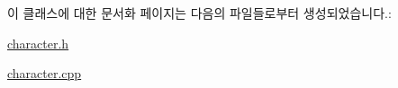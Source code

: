 이 클래스에 대한 문서화 페이지는 다음의 파일들로부터 생성되었습니다.\-:\begin{DoxyCompactItemize}
\item 
\hyperlink{character_8h}{character.\-h}\item 
\hyperlink{character_8cpp}{character.\-cpp}\end{DoxyCompactItemize}
